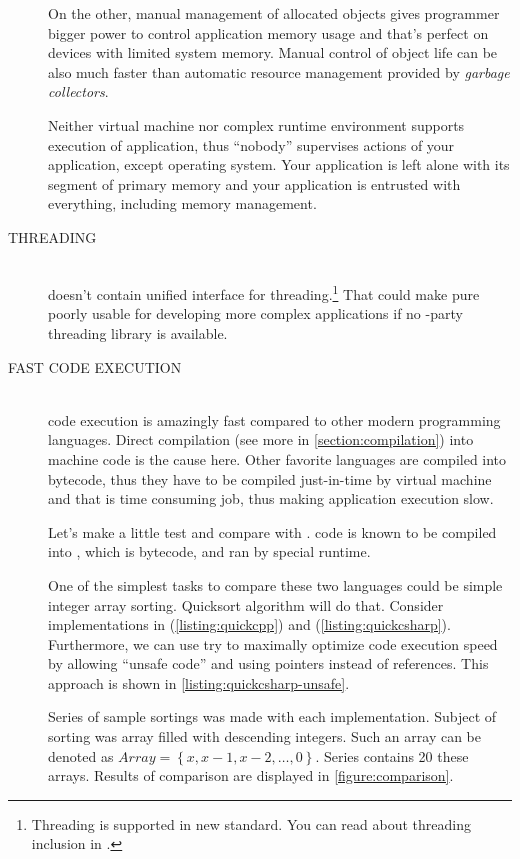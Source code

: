 \begin{description}
On the other, manual management of allocated objects gives programmer bigger power to control application memory usage and that's perfect on devices with limited system memory. Manual control of object life can be also much faster than automatic resource management provided by \textit{garbage collectors}.

Neither virtual machine nor complex runtime environment supports execution of \cpp{} application, thus \enquote{nobody} supervises actions of your application, except operating system. Your application is left alone with its segment of primary memory and your application is entrusted with everything, including memory management.

\item[THREADING\ts{\textcolor{red}{bad}}]\hfill \\
\cpp{} doesn't contain unified interface for threading.\footnote{Threading is supported in new  standard. You can read about threading inclusion in \citep[p.~1114-1160]{various:cppstandard}.} That could make pure \cpp{} poorly usable for developing more complex applications if no -party threading library is available.

\item[FAST CODE EXECUTION\ts{\textcolor{YellowOrange}{great}}]\hfill \\
\cpp{} code execution is amazingly fast compared to other modern programming languages. Direct compilation (see more in \autoref{section:compilation})  into machine code is the cause here. Other favorite languages are compiled into bytecode, thus they have to be compiled just-in-time by virtual machine and that is time consuming job, thus making application execution slow.

Let's make a little test and compare \cpp{} with \csharp. \csharp{} code is known to be compiled into , which is bytecode, and ran by special runtime.

One of the simplest tasks to compare these two languages could be simple integer array sorting. Quicksort algorithm will do that. Consider implementations in \cpp{} (\autoref{listing:quickcpp}) and \csharp{} (\autoref{listing:quickcsharp}). Furthermore, we can use try to maximally optimize \csharp{} code execution speed by allowing \enquote{unsafe code} and using pointers instead of references. This approach is shown in \autoref{listing:quickcsharp-unsafe}.

Series of sample sortings was made with each implementation. Subject of sorting was array filled with descending integers. Such an array can be denoted as $Array = \left\{ x, x-1, x-2, \ldots, 0 \right\}$. Series contains 20 these arrays. Results of comparison are displayed in \autoref{figure:comparison}.


\end{description}
